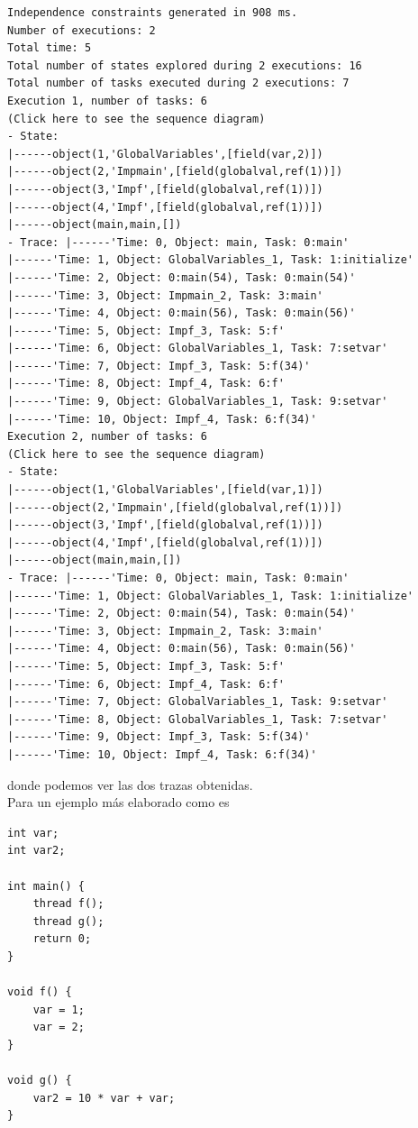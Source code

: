 \begin{verbatim}
Independence constraints generated in 908 ms.
Number of executions: 2
Total time: 5
Total number of states explored during 2 executions: 16
Total number of tasks executed during 2 executions: 7
Execution 1, number of tasks: 6
(Click here to see the sequence diagram)
- State:
|------object(1,'GlobalVariables',[field(var,2)])
|------object(2,'Impmain',[field(globalval,ref(1))])
|------object(3,'Impf',[field(globalval,ref(1))])
|------object(4,'Impf',[field(globalval,ref(1))])
|------object(main,main,[])
- Trace: |------'Time: 0, Object: main, Task: 0:main'
|------'Time: 1, Object: GlobalVariables_1, Task: 1:initialize'
|------'Time: 2, Object: 0:main(54), Task: 0:main(54)'
|------'Time: 3, Object: Impmain_2, Task: 3:main'
|------'Time: 4, Object: 0:main(56), Task: 0:main(56)'
|------'Time: 5, Object: Impf_3, Task: 5:f'
|------'Time: 6, Object: GlobalVariables_1, Task: 7:setvar'
|------'Time: 7, Object: Impf_3, Task: 5:f(34)'
|------'Time: 8, Object: Impf_4, Task: 6:f'
|------'Time: 9, Object: GlobalVariables_1, Task: 9:setvar'
|------'Time: 10, Object: Impf_4, Task: 6:f(34)'
Execution 2, number of tasks: 6
(Click here to see the sequence diagram)
- State:
|------object(1,'GlobalVariables',[field(var,1)])
|------object(2,'Impmain',[field(globalval,ref(1))])
|------object(3,'Impf',[field(globalval,ref(1))])
|------object(4,'Impf',[field(globalval,ref(1))])
|------object(main,main,[])
- Trace: |------'Time: 0, Object: main, Task: 0:main'
|------'Time: 1, Object: GlobalVariables_1, Task: 1:initialize'
|------'Time: 2, Object: 0:main(54), Task: 0:main(54)'
|------'Time: 3, Object: Impmain_2, Task: 3:main'
|------'Time: 4, Object: 0:main(56), Task: 0:main(56)'
|------'Time: 5, Object: Impf_3, Task: 5:f'
|------'Time: 6, Object: Impf_4, Task: 6:f'
|------'Time: 7, Object: GlobalVariables_1, Task: 9:setvar'
|------'Time: 8, Object: GlobalVariables_1, Task: 7:setvar'
|------'Time: 9, Object: Impf_3, Task: 5:f(34)'
|------'Time: 10, Object: Impf_4, Task: 6:f(34)'
\end{verbatim}
donde podemos ver las dos trazas obtenidas.\\

Para un ejemplo más elaborado como es
\begin{lstlisting}
int var;
int var2;

int main() {
    thread f();
    thread g();
    return 0;
}

void f() {
    var = 1;
    var = 2;
}

void g() {
    var2 = 10 * var + var;
}
\end{lstlisting}

